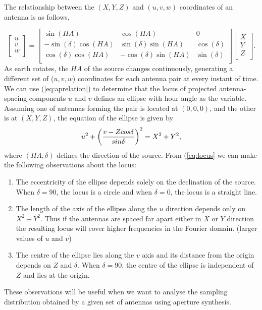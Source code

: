 The relationship between the $(X, Y, Z)$ and $(u, v, w)$ coordinates of an antenna is as follows,

\begin{equation}
\begin{bmatrix}
    u\\  v\\  w\\   \end{bmatrix} =
  \begin{bmatrix}
   \sin(HA) & \cos(HA) & 0\\        -\sin(\delta)\cos(HA) & \sin(\delta)\sin(HA)  & \cos(\delta)\\      \cos(\delta)\cos(HA) & -\cos(\delta)\sin(HA)  & \sin(\delta)\\    \end{bmatrix}   
\begin{bmatrix}
   X\\  Y\\  Z\\   \end{bmatrix}. 
   \label{eq:aprelation}
  \end{equation}
 As earth rotates, the $HA$ of the source changes continuously, generating a different set of ($u,v,w$) coordinates for each antenna pair at every instant of time. We can use (\ref{eq:aprelation}) to determine that the locus of projected antenna-spacing components $u$ and $v$ defines an ellipse with hour angle as the variable. Assuming one of antennas forming the pair is located at $(0,0,0)$, and the other is at $(X, Y, Z)$, the equation of the ellipse is given by 
\begin{equation}
u^2+\left({v - Z cos \delta \over {sin \delta}}\right)^2 =
X^2 + Y^2,
\label{eq:locus}
\end{equation}
where  $(HA,\delta)$ defines the direction of the source.
From (\ref{eq:locus} we can make the following observations about the locus:
\begin{enumerate}
\item
The eccentricity of the ellipse depends solely on the declination of the source. When $\delta = 90$, the locus is a circle and when $\delta = 0$, the locus is a straight line.
\item
The length of the axis of the ellipse along the $u$ direction depends only on $X^2 + Y^2$. Thus if the antennas are spaced far apart either in $X$ or $Y$ direction the resulting locus will cover higher frequencies in the Fourier domain. (larger values of $u$ and $v$)
\item
The centre of the ellipse lies along the $v$ axis and its distance from the origin depends on $Z$ and $\delta$. When $\delta = 90$, the centre of the ellipse is independent of $Z$ and lies at the origin.
\end{enumerate}
These observations will be useful when we want to analyse the sampling distribution obtained by a given set of antennas using aperture synthesis.

